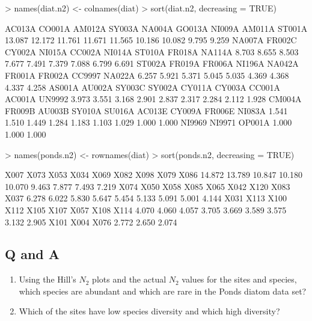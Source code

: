\documentclass[a4paper,10pt]{article}
\begin{document}
\begin{Schunk}
\begin{Sinput}
> names(diat.n2) <- colnames(diat)
> sort(diat.n2, decreasing = TRUE)
\end{Sinput}
\begin{Soutput}
AC013A CO001A AM012A SY003A NA004A GO013A NI009A AM011A ST001A 
13.087 12.172 11.761 11.671 11.565 10.186 10.082  9.795  9.259 
NA007A FR002C CY002A NI015A CC002A NI014A ST010A FR018A NA114A 
 8.703  8.655  8.503  7.677  7.491  7.379  7.088  6.799  6.691 
ST002A FR019A FR006A NI196A NA042A FR001A FR002A CC9997 NA022A 
 6.257  5.921  5.371  5.045  5.035  4.369  4.368  4.337  4.258 
AS001A AU002A SY003C SY002A CY011A CY003A CC001A AC001A UN9992 
 3.973  3.551  3.168  2.901  2.837  2.317  2.284  2.112  1.928 
CM004A FR009B AU003B SY010A SU016A AC013E CY009A FR006E NI083A 
 1.541  1.510  1.449  1.284  1.183  1.103  1.029  1.000  1.000 
NI9969 NI9971 OP001A 
 1.000  1.000  1.000 
\end{Soutput}
\begin{Sinput}
> names(ponds.n2) <- rownames(diat)
> sort(ponds.n2, decreasing = TRUE)
\end{Sinput}
\begin{Soutput}
  X007   X073   X053   X034   X069   X082   X098   X079   X086 
14.872 13.789 10.847 10.180 10.070  9.463  7.877  7.493  7.219 
  X074   X050   X058   X085   X065   X042   X120   X083   X037 
 6.278  6.022  5.830  5.647  5.454  5.133  5.091  5.001  4.144 
  X031   X113   X100   X112   X105   X107   X057   X108   X114 
 4.070  4.060  4.057  3.705  3.669  3.589  3.575  3.132  2.905 
  X101   X004   X076 
 2.772  2.650  2.074 
\end{Soutput}
\end{Schunk}

\subsection*{Q and A}
\begin{enumerate}
\item Using the Hill's $N_2$ plots and the actual $N_2$ values for the sites and species, which species are abundant and which are rare in the Ponds diatom data set?
\item Which of the sites have low species diversity and which high diversity?
\end{enumerate}
\end{document}
